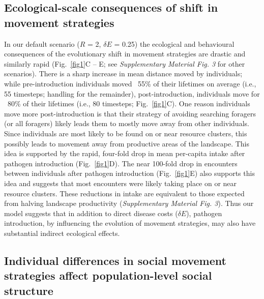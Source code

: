 \subsection*{Ecological-scale consequences of shift in movement strategies}

In our default scenario ($R$ = 2, $\delta E$ = 0.25) the ecological and behavioural consequences of the evolutionary shift in movement strategies are drastic and similarly rapid (Fig.~\ref{fig1}C -- E; see \textit{Supplementary Material Fig. 3} for other scenarios).
There is a sharp increase in mean distance moved by individuals; while pre-introduction individuals moved ~55\% of their lifetimes on average (i.e., 55 timesteps; handling for the remainder), post-introduction, individuals move for ~80\% of their lifetimes (i.e., 80 timesteps; Fig.~\ref{fig1}C).
One reason individuals move more post-introduction is that their strategy of avoiding searching foragers (or all foragers) likely leads them to mostly move away from other individuals.
Since individuals are most likely to be found on or near resource clusters, this possibly leads to movement away from productive areas of the landscape.
This idea is supported by the rapid, four-fold drop in mean per-capita intake after pathogen introduction (Fig.~\ref{fig1}D).
The near 100-fold drop in encounters between individuals after pathogen introduction (Fig.~\ref{fig1}E) also supports this idea and suggests that most encounters were likely taking place on or near resource clusters.
These reductions in intake are equivalent to those expected from halving landscape productivity (\textit{Supplementary Material Fig. 3}).
Thus our model suggests that in addition to direct disease costs ($\delta E$), pathogen introduction, by influencing the evolution of movement strategies, may also have substantial indirect ecological effects.

\subsection*{Individual differences in social movement strategies affect population-level social structure}

